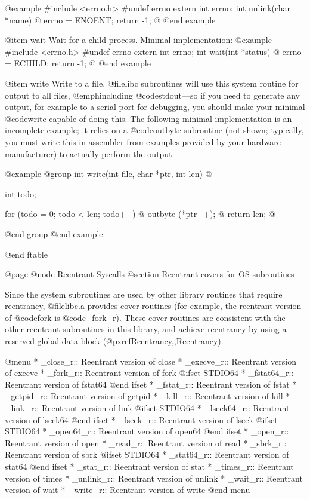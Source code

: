 @example
#include <errno.h>
#undef errno
extern int errno;
int unlink(char *name) @{
  errno = ENOENT;
  return -1; 
@}
@end example

@item wait
Wait for a child process.  Minimal implementation:
@example
#include <errno.h>
#undef errno
extern int errno;
int wait(int *status) @{
  errno = ECHILD;
  return -1;
@}
@end example

@item write
Write to a file.  @file{libc} subroutines will use this
system routine for output to all files, @emph{including}
@code{stdout}---so if you need to generate any output, for example to a
serial port for debugging, you should make your minimal @code{write}
capable of doing this.  The following minimal implementation is an
incomplete example; it relies on a @code{outbyte} subroutine (not
shown; typically, you must write this in assembler from examples
provided by your hardware manufacturer) to actually perform the output.

@example
@group
int write(int file, char *ptr, int len) @{
  int todo;

  for (todo = 0; todo < len; todo++) @{
    outbyte (*ptr++);
  @}
  return len;
@}
@end group
@end example

@end ftable

@page
@node Reentrant Syscalls
@section Reentrant covers for OS subroutines

Since the system subroutines are used by other library routines that
require reentrancy, @file{libc.a} provides cover routines (for example,
the reentrant version of @code{fork} is @code{_fork_r}).  These cover
routines are consistent with the other reentrant subroutines in this
library, and achieve reentrancy by using a reserved global data block
(@pxref{Reentrancy,,Reentrancy}).

@menu
* _close_r::	Reentrant version of close
* _execve_r::	Reentrant version of execve
* _fork_r::	Reentrant version of fork
@ifset STDIO64
* _fstat64_r::	Reentrant version of fstat64
@end ifset
* _fstat_r::	Reentrant version of fstat
* _getpid_r::	Reentrant version of getpid
* _kill_r::	Reentrant version of kill
* _link_r::	Reentrant version of link
@ifset STDIO64
* _lseek64_r::	Reentrant version of lseek64
@end ifset
* _lseek_r::	Reentrant version of lseek
@ifset STDIO64
* _open64_r::	Reentrant version of open64
@end ifset
* _open_r::	Reentrant version of open
* _read_r::	Reentrant version of read
* _sbrk_r::	Reentrant version of sbrk
@ifset STDIO64
* _stat64_r::	Reentrant version of stat64
@end ifset
* _stat_r::	Reentrant version of stat
* _times_r::	Reentrant version of times
* _unlink_r::	Reentrant version of unlink
* _wait_r::	Reentrant version of wait
* _write_r::	Reentrant version of write
@end menu

